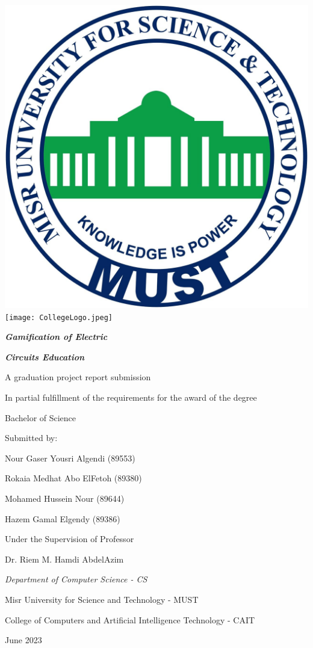 \documentclass[../main.tex]{subfiles}
\begin{document}
\centering
\includegraphics[width=0.2\columnwidth]{../images/MustLogo.jpg}
\hspace{6cm}
\texttt{[image: CollegeLogo.jpeg]}
\vspace{2cm}

\textit{\textbf{\LARGE Gamification of Electric}}

\textit{\textbf{\LARGE Circuits Education}}

\vspace{2cm}
A graduation project report submission

In partial fulfillment of the requirements for the award of the degree

Bachelor of Science

\vspace{2.5cm}
\large
Submitted by:

\vspace{1cm}
Nour Gaser Yousri Algendi (89553)

Rokaia Medhat Abo ElFetoh (89380)

Mohamed Hussein Nour (89644)

 Hazem Gamal Elgendy (89386)
 
\vspace{2.5cm}
Under the Supervision of Professor

Dr. Riem M. Hamdi AbdelAzim

\vspace{2.5cm}
\normalsize
\textit{Department of Computer Science - CS}

Misr University for Science and Technology - MUST

College of Computers and Artificial Intelligence Technology - CAIT

June 2023
\end{document}
